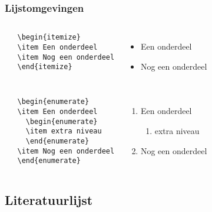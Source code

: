 \documentclass[aspectratio=169]{beamer}
\begin{document}
\begin{frame}[fragile]
 \frametitle{Lijstomgevingen}

 \begin{columns}[c]
   \begin{verbatim}
   \begin{itemize}
   \item Een onderdeel
   \item Nog een onderdeel
   \end{itemize}
   \end{verbatim}

   \begin{itemize}
     \item Een onderdeel
     \item Nog een onderdeel
   \end{itemize}
 \end{columns}

 \pause

 \begin{columns}[c]
   \begin{verbatim}
   \begin{enumerate}
   \item Een onderdeel
     \begin{enumerate}
     \item extra niveau
     \end{enumerate}
   \item Nog een onderdeel
   \end{enumerate}
   \end{verbatim}

   \begin{enumerate}
     \item Een onderdeel
     \begin{enumerate}
       \item extra niveau
     \end{enumerate}
     \item Nog een onderdeel
   \end{enumerate}
 \end{columns}

\end{frame}

\subsection{Literatuurlijst}
\end{document}
